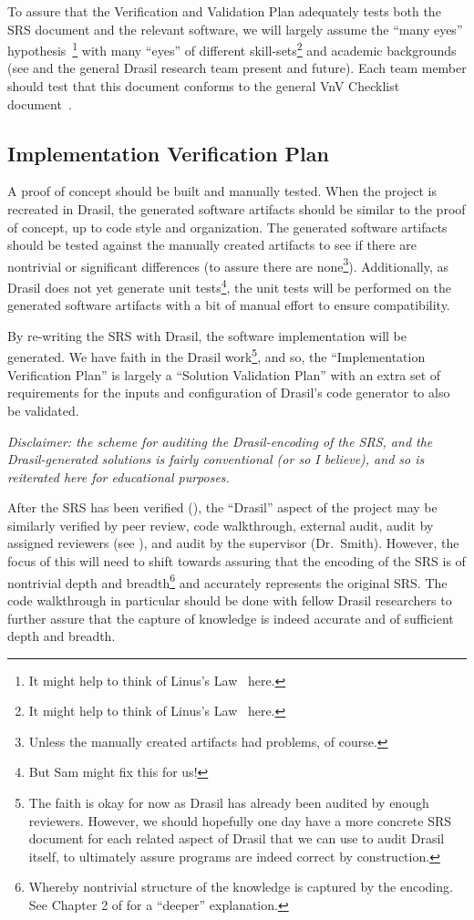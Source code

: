 \documentclass[12pt, titlepage]{article}
\begin{document}
To assure that the Verification and Validation Plan adequately tests both the
SRS document and the relevant software, we will largely assume the ``many eyes''
hypothesis~\cite{Caraco1980avian}\footnote{It might help to think of Linus's
Law~\cite{LinussLawWiki} here.} with many ``eyes'' of different
skill-sets\footnote{It might help to think of Linus's Law~\cite{LinussLawWiki}
here.} and academic backgrounds (see  and the general
Drasil research team present and future). Each team member should test that this
document conforms to the general VnV Checklist document~\cite{SmithCapTemplate}.

\subsection{Implementation Verification Plan}

A proof of concept should be built and manually tested. When the project is
recreated in Drasil, the generated software artifacts should be similar to the
proof of concept, up to code style and organization. The generated software
artifacts should be tested against the manually created artifacts to see if
there are nontrivial or significant differences (to assure there are
none\footnote{Unless the manually created artifacts had problems, of course.}).
Additionally, as Drasil does not yet generate unit tests\footnote{But Sam might
fix this for us!}, the unit tests will be performed on the generated software
artifacts with a bit of manual effort to ensure compatibility.

By re-writing the SRS with Drasil, the software implementation will be
generated. We have faith in the Drasil work\footnote{The faith is okay for now
as Drasil has already been audited by enough reviewers. However, we should
hopefully one day have a more concrete SRS document for each related aspect of
Drasil that we can use to audit Drasil itself, to ultimately assure programs are
indeed correct by construction.}, and so, the ``Implementation Verification
Plan'' is largely a ``Solution Validation Plan'' with an extra set of
requirements for the inputs and configuration of Drasil's code generator to also
be validated. 

\textit{Disclaimer: the scheme for auditing the Drasil-encoding of the SRS, and
the Drasil-generated solutions is fairly conventional (or so I believe), and so
is reiterated here for educational purposes.}

After the SRS has been verified (), the ``Drasil''
aspect of the project may be similarly verified by peer review, code
walkthrough, external audit, audit by assigned reviewers (see
), and audit by the supervisor (Dr.~Smith). However, the
focus of this will need to shift towards assuring that the encoding of the SRS
is of nontrivial depth and breadth\footnote{Whereby nontrivial structure of
the knowledge is captured by the encoding. See Chapter 2 of \cite{Balaci2022MSc}
for a ``deeper'' explanation.} and accurately represents the original SRS. The
code walkthrough in particular should be done with fellow Drasil researchers to
further assure that the capture of knowledge is indeed accurate and of
sufficient depth and breadth. 
\end{document}
